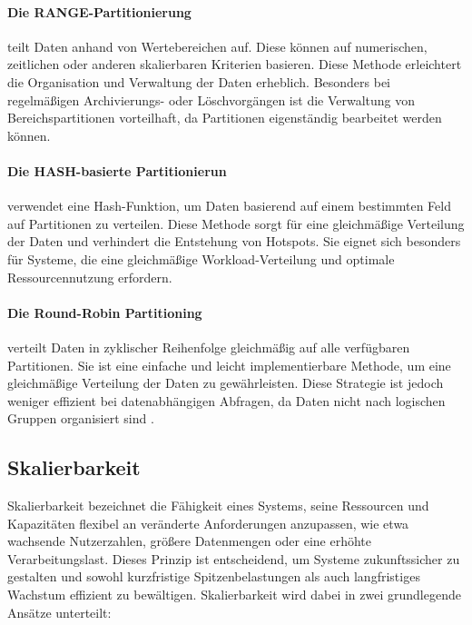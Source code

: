 \paragraph{Die RANGE-Partitionierung} teilt Daten anhand von Wertebereichen auf. Diese können auf numerischen, zeitlichen oder anderen skalierbaren Kriterien basieren. Diese Methode erleichtert die Organisation und Verwaltung der Daten erheblich. Besonders bei regelmäßigen Archivierungs- oder Löschvorgängen ist die Verwaltung von Bereichspartitionen vorteilhaft, da Partitionen eigenständig bearbeitet werden können.
\paragraph{Die HASH-basierte Partitionierun} verwendet eine Hash-Funktion, um Daten basierend auf einem bestimmten Feld auf Partitionen zu verteilen. Diese Methode sorgt für eine gleichmäßige Verteilung der Daten und verhindert die Entstehung von Hotspots. Sie eignet sich besonders für Systeme, die eine gleichmäßige Workload-Verteilung und optimale Ressourcennutzung erfordern.
\paragraph{Die Round-Robin Partitioning} verteilt Daten in zyklischer Reihenfolge gleichmäßig auf alle verfügbaren Partitionen. Sie ist eine einfache und leicht implementierbare Methode, um eine gleichmäßige Verteilung der Daten zu gewährleisten. Diese Strategie ist jedoch weniger effizient bei datenabhängigen Abfragen, da Daten nicht nach logischen Gruppen organisiert sind \cite{g4g-partitioning}.



\subsection{Skalierbarkeit}

Skalierbarkeit bezeichnet die Fähigkeit eines Systems, seine Ressourcen und Kapazitäten flexibel an
veränderte Anforderungen anzupassen, wie etwa wachsende Nutzerzahlen, größere Datenmengen oder eine erhöhte Verarbeitungslast.
Dieses Prinzip ist entscheidend, um Systeme zukunftssicher zu gestalten und sowohl kurzfristige Spitzenbelastungen als auch
langfristiges Wachstum effizient zu bewältigen.
Skalierbarkeit wird dabei in zwei grundlegende Ansätze unterteilt:


